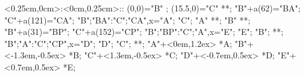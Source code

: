
%

\xy    <0.25cm,0cm>:<0cm,0.25cm>::
       (0,0)="B" ; (15.5,0)="C" **\dir{-}; 
       "B"+a(62)="BA"; "C"+a(121)="CA";
       {"B";"BA":"C";"CA",x}="A"; 
       "C"; "A" **\dir{-}; "B" **\dir{-};
       "B"+a(31)="BP"; "C"+a(152)="CP";
       {"B";"BP":"C";"A",x}="E"; "E"; "B"; **\dir{-};
       {"B";"A":"C";"CP",x}="D"; "D"; "C"; **\dir{-};
	 "A"+<0em,1.2ex> *{A};
	 "B"+<-1.3em,-0.5ex> *{B}; 
	 "C"+<1.3em,-0.5ex> *{C};
	 "D"+<-0.7em,0.5ex> *{D};
	 "E"+<0.7em,0.5ex> *{E};
       \endxy%

